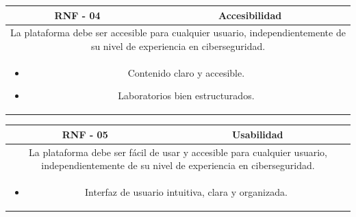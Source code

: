             \begin{table}[!htbp]
                \centering

                \begin{tabular}{|c|c|}
                    \hline
                    \textbf{RNF - 04} & \textbf{Accesibilidad} \\
                    \hline
                    \multicolumn{2}{|p{15cm}|}{
                        La plataforma debe ser accesible para cualquier usuario, independientemente de su nivel de experiencia en ciberseguridad.
                    } \\
                    \hline
                    \multicolumn{2}{|p{15cm}|}{
                        \begin{itemize}
                            \item Contenido claro y accesible.
                            \item Laboratorios bien estructurados.
                        \end{itemize}
                        } \\
                    \hline
                \end{tabular}

                \label{tab:RNF4}
            \end{table}
            
            \begin{table}[!htbp]
                \centering

                \begin{tabular}{|c|c|}
                    \hline
                    \textbf{RNF - 05} & \textbf{Usabilidad} \\
                    \hline
                    \multicolumn{2}{|p{15cm}|}{
                        La plataforma debe ser fácil de usar y accesible para cualquier usuario, independientemente de su nivel de experiencia en ciberseguridad.
                    } \\
                    \hline
                    \multicolumn{2}{|p{15cm}|}{
                        \begin{itemize}
                            \item Interfaz de usuario intuitiva, clara y organizada.
                        \end{itemize}
                        } \\
                    \hline
                \end{tabular}

                \label{tab:RNF5}
            \end{table}
            
